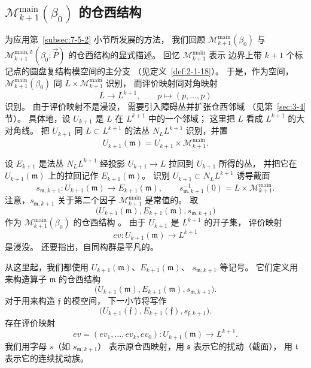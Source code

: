 
\subsection{$\mathcal M_{k+1}^{\mathrm{main}}(\beta_0)$
的仓西结构}
\label{subsec:7-5-3}

为应用第~\ref{subsec:7-5-2} 小节所发展的方法，
我们回顾
$\mathcal M_{k+1}^{\mathrm{main}}(\beta_0)$ 与
$\mathcal M_{k+1}^{\mathrm{main},\mathfrak d}
(\beta_0;\vec P)$
的仓西结构的显式描述。
回忆 $\mathcal M_{k+1}^{\mathrm{main}}$ 表示
边界上带 $k+1$ 个标记点的圆盘复结构模空间的主分支
（见定义~\ref{def:2-1-18}）。
于是，作为空间，
$\mathcal M_{k+1}^{\mathrm{main}}(\beta_0)$
同 $L\times\mathcal M_{k+1}^{\mathrm{main}}$ 识别，
而评价映射同对角映射
\[
L\longrightarrow L^{k+1},
\qquad
p\longmapsto(p,\ldots,p)
\]
识别。
由于评价映射不是浸没，
需要引入障碍丛并扩张仓西邻域
（见第~\ref{sec:3-4} 节）。
具体地，设 $U_{k+1}$ 是 $L$ 在 $L^{k+1}$ 中的一个邻域；
这里把 $L$ 看成 $L^{k+1}$ 的大对角线。
把 $U_{k+1}$ 同 $L\subset L^{k+1}$ 的法丛
$N_L L^{k+1}$ 识别，并置
\[
U_{k+1}(\mathfrak m)
=U_{k+1}\times\mathcal M_{k+1}^{\mathrm{main}}.
\]

设 $E_{k+1}$ 是法丛 $N_L L^{k+1}$
经投影 $U_{k+1}\to L$ 拉回到 $U_{k+1}$ 所得的丛，
并把它在 $U_{k+1}(\mathfrak m)$ 上的拉回记作
$E_{k+1}(\mathfrak m)$。
识别 $U_{k+1}\subset N_L L^{k+1}$ 诱导截面
\[
s_{\mathfrak m,k+1}\colon
U_{k+1}(\mathfrak m)\longrightarrow E_{k+1}(\mathfrak m),
\qquad
s_{\mathfrak m,k+1}^{-1}(0)
=L\times\mathcal M_{k+1}^{\mathrm{main}}.
\]
注意，$s_{\mathfrak m,k+1}$ 关于第二个因子
$\mathcal M_{k+1}^{\mathrm{main}}$ 是常值的。
取
\[
\bigl(U_{k+1}(\mathfrak m),
E_{k+1}(\mathfrak m),s_{\mathfrak m,k+1}\bigr)
\]
作为 $\mathcal M_{k+1}^{\mathrm{main}}(\beta_0)$
的仓西结构
。
由于 $U_{k+1}$ 是 $L^{k+1}$ 的开子集，
评价映射
\[
ev\colon U_{k+1}(\mathfrak m)\longrightarrow L^{k+1}
\]
是浸没。
还要指出，自同构群是平凡的。

从这里起，我们都使用
$U_{k+1}(\mathfrak m)$、$E_{k+1}(\mathfrak m)$、
$s_{\mathfrak m,k+1}$ 等记号。
它们定义用来构造算子 $\mathfrak m$ 的仓西结构
\[
\bigl(U_{k+1}(\mathfrak m),
E_{k+1}(\mathfrak m),s_{\mathfrak m,k+1}\bigr).
\]
对于用来构造 $\mathfrak f$ 的模空间，
下一小节将写作
\[
\bigl(U_{k+1}(\mathfrak f),
E_{k+1}(\mathfrak f),s_{\mathfrak f,k+1}\bigr).
\]
存在评价映射
\[
ev=(ev_1,\ldots,ev_k,ev_0)\colon
U_{k+1}(\mathfrak m)\longrightarrow L^{k+1}.
\]
我们用字母 $s$（如 $s_{\mathfrak m,k+1}$）
表示原仓西映射，用 $\mathfrak s$ 表示它的扰动（截面），
用 $\mathfrak t$ 表示它的连续扰动族。

